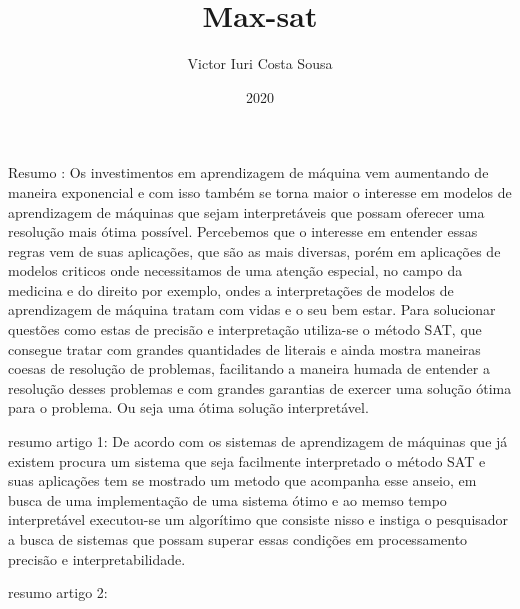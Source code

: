 \documentclass[a4paper, 12 pt]{article}
\title{Max-sat}
\author{Victor Iuri Costa Sousa}
\date{2020}
\begin{document}
Resumo : Os investimentos em aprendizagem de máquina vem aumentando de maneira exponencial e com isso também se torna maior o interesse em modelos de aprendizagem de máquinas que sejam interpretáveis que possam oferecer uma resolução mais ótima possível. Percebemos que o interesse em entender essas regras vem de suas aplicações, que são as mais diversas, porém em aplicações de modelos criticos onde necessitamos de uma atenção especial, no campo da medicina e do direito por exemplo, ondes a interpretações de modelos de aprendizagem de máquina tratam com vidas e o seu bem estar. Para solucionar questões como estas de precisão e interpretação utiliza-se o método SAT, que consegue tratar com grandes quantidades de literais e ainda mostra maneiras coesas de resolução de problemas, facilitando a maneira humada de entender a resolução desses problemas e com grandes garantias de exercer uma solução ótima para o problema. Ou seja uma ótima solução interpretável.


resumo artigo 1:
	De acordo com os sistemas de aprendizagem de máquinas que já existem procura um sistema que seja facilmente interpretado o método SAT e suas aplicações tem se mostrado um metodo que acompanha esse anseio, em busca de uma implementação de uma sistema ótimo e ao memso tempo interpretável executou-se um algorítimo que consiste nisso e instiga o pesquisador a busca de sistemas que possam superar essas condições em processamento precisão e interpretabilidade.
	
resumo artigo 2:
\end{document}
